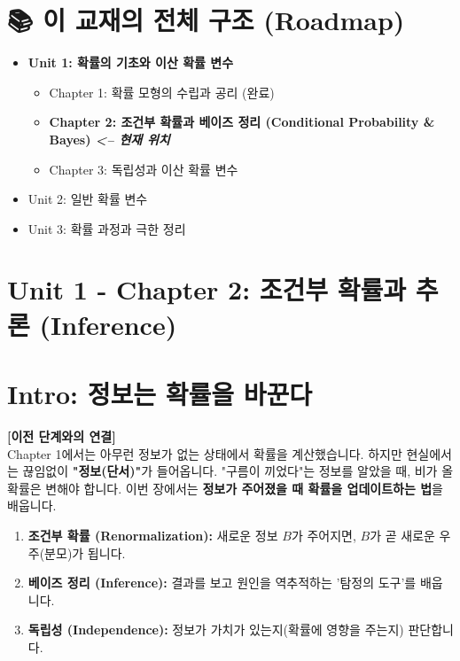 \documentclass[11pt,a4paper]{book}
\newcommand{\chaptertitle}[2]{\section*{#1: #2}}
\theoremstyle{definition}
\begin{document}
\section*{📚 이 교재의 전체 구조 (Roadmap)}
\begin{itemize}
    \item \textbf{Unit 1: 확률의 기초와 이산 확률 변수}
    \begin{itemize}
        \item Chapter 1: 확률 모형의 수립과 공리 (완료)
        \item[$\to$] \textbf{\textcolor{mainblue}{Chapter 2: 조건부 확률과 베이즈 정리 (Conditional Probability \& Bayes) \textit{<-- 현재 위치}}}
        \item Chapter 3: 독립성과 이산 확률 변수
    \end{itemize}
    \item Unit 2: 일반 확률 변수
    \item Unit 3: 확률 과정과 극한 정리
\end{itemize}
\vspace{1cm}

\chaptertitle{Unit 1 - Chapter 2}{조건부 확률과 추론 (Inference)}

\section*{Intro: 정보는 확률을 바꾼다}

\textbf{[이전 단계와의 연결]} \\
Chapter 1에서는 아무런 정보가 없는 상태에서 확률을 계산했습니다. 하지만 현실에서는 끊임없이 \textbf{"정보(단서)"}가 들어옵니다. "구름이 끼었다"는 정보를 알았을 때, 비가 올 확률은 변해야 합니다. 이번 장에서는 \textbf{정보가 주어졌을 때 확률을 업데이트하는 법}을 배웁니다.

\begin{tcolorbox}[colback=subgray, title={\textbf{📌 이 단원의 핵심 개요 (Overview)}}]
\begin{enumerate}
    \item \textbf{조건부 확률 (Renormalization):} 새로운 정보 $B$가 주어지면, $B$가 곧 새로운 우주(분모)가 됩니다.
    \item \textbf{베이즈 정리 (Inference):} 결과를 보고 원인을 역추적하는 '탐정의 도구'를 배웁니다.
    \item \textbf{독립성 (Independence):} 정보가 가치가 있는지(확률에 영향을 주는지) 판단합니다.
\end{enumerate}
\end{tcolorbox}
\end{document}
